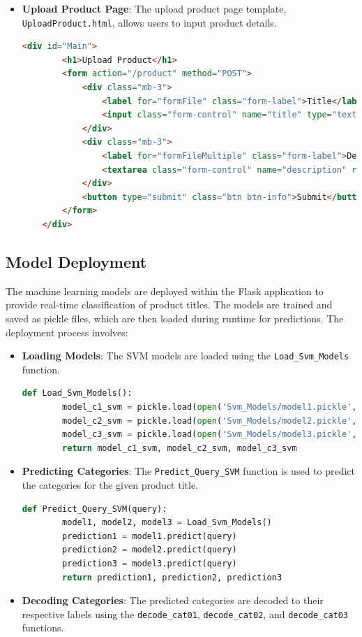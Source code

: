 \documentclass[10pt]{article}
\begin{document}
\begin{itemize}
    \item \textbf{Upload Product Page}: The upload product page template, \texttt{UploadProduct.html}, allows users to input product details.
    \begin{lstlisting}[language=HTML]
    <div id="Main">
        <h1>Upload Product</h1>
        <form action="/product" method="POST">
            <div class="mb-3">
                <label for="formFile" class="form-label">Title</label>
                <input class="form-control" name="title" type="text" id="formFile" required placeholder="Enter Product Title"/>
            </div>
            <div class="mb-3">
                <label for="formFileMultiple" class="form-label">Description</label>
                <textarea class="form-control" name="description" rows="10" cols="50" id="formFileMultiple" multiple placeholder="Enter Product Description for more accurate results"></textarea>
            </div>
            <button type="submit" class="btn btn-info">Submit</button>
        </form>
    </div>
    \end{lstlisting}
\end{itemize}

\subsection{Model Deployment}
The machine learning models are deployed within the Flask application to provide real-time classification of product titles. The models are trained and saved as pickle files, which are then loaded during runtime for predictions. The deployment process involves:
\begin{itemize}
    \item \textbf{Loading Models}: The SVM models are loaded using the \texttt{Load\_Svm\_Models} function.
    \begin{lstlisting}[language=Python]
    def Load_Svm_Models():
        model_c1_svm = pickle.load(open('Svm_Models/model1.pickle', 'rb'))
        model_c2_svm = pickle.load(open('Svm_Models/model2.pickle', 'rb'))
        model_c3_svm = pickle.load(open('Svm_Models/model3.pickle', 'rb'))
        return model_c1_svm, model_c2_svm, model_c3_svm
    \end{lstlisting}
    
    \item \textbf{Predicting Categories}: The \texttt{Predict\_Query\_SVM} function is used to predict the categories for the given product title.
    \begin{lstlisting}[language=Python]
    def Predict_Query_SVM(query):
        model1, model2, model3 = Load_Svm_Models()
        prediction1 = model1.predict(query)
        prediction2 = model2.predict(query)
        prediction3 = model3.predict(query)
        return prediction1, prediction2, prediction3
    \end{lstlisting}
    
    \item \textbf{Decoding Categories}: The predicted categories are decoded to their respective labels using the \texttt{decode\_cat01}, \texttt{decode\_cat02}, and \texttt{decode\_cat03} functions.
\end{itemize}
\end{document}
